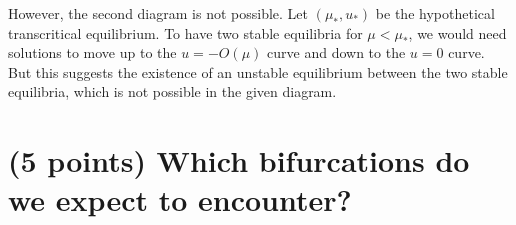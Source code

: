 \documentclass[12pt]{article}
\begin{document}
\begin{center}
\end{center}

\color{blue}
However, the second diagram is not possible. Let $(\mu_*, u_*)$ be the hypothetical transcritical equilibrium. To have two stable equilibria for $\mu < \mu_*$, we would need solutions to move up to the $u = -O(\mu)$ curve and down to the $u = 0$ curve. But this suggests the existence of an unstable equilibrium between the two stable equilibria, which is not possible in the given diagram.
\color{black}

\pagebreak


\section{(5 points) Which bifurcations do we expect to encounter?}
\end{document}
